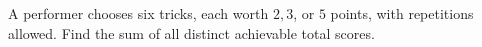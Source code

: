 A performer chooses six tricks, each worth $2,3$, or $5$ points, with repetitions allowed. Find the sum of all distinct achievable total scores.
